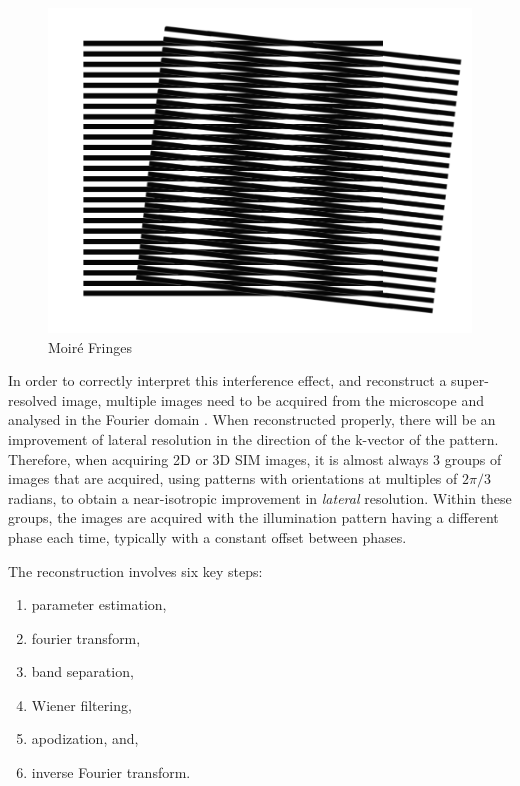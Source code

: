 \documentclass[12pt]{article}
\begin{document}
\begin{figure}[hbtp]
    \includegraphics[scale=0.5]{figures/moire.png}
    \caption{Moir\'{e} Fringes}
    \label{fig:moire}
\end{figure}

In order to correctly interpret this interference effect, and reconstruct a super-resolved image,
multiple images need to be acquired from the microscope and analysed in the Fourier domain \cite{originalSIM}.
When reconstructed properly, there will be an improvement of lateral resolution in the direction of the k-vector of the pattern.
Therefore, when acquiring 2D or 3D SIM images, it is almost always 3 groups of images that are acquired,
using patterns with orientations at multiples of $2\pi/3$ radians,
to obtain a near-isotropic improvement in \textit{lateral} resolution.
Within these groups, the images are acquired with the illumination pattern having a different phase each time,
typically with a constant offset between phases.

The reconstruction involves six key steps:

\begin{enumerate}
    \item parameter estimation,
    \item fourier transform,
    \item band separation,
    \item Wiener filtering,
    \item apodization, and,
    \item inverse Fourier transform.
\end{enumerate}
\end{document}

